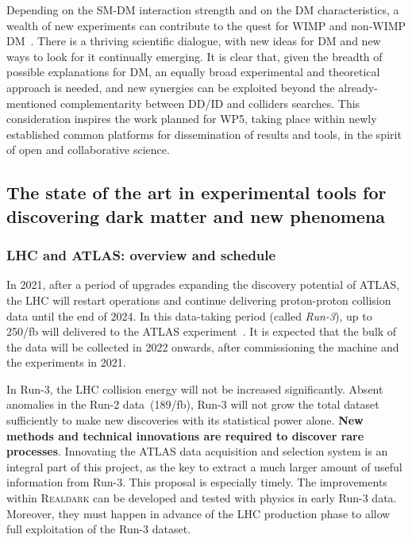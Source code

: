 Depending on the SM-DM interaction strength and on the DM characteristics, a wealth of new experiments can contribute to the quest for WIMP and non-WIMP DM~\cite{Beacham:2019nyx,Bertone:2019irm,Barausse:2020rsu}.
There is a thriving scientific dialogue, with new ideas for DM and new ways to look for it continually emerging.
It is clear that, given the breadth of possible explanations for DM, an equally broad experimental and theoretical approach is needed, 
and new synergies can be exploited beyond the already-mentioned complementarity between DD/ID and colliders searches. 
This consideration inspires the work planned for WP5, taking place within newly established common platforms for dissemination of results and tools, in the spirit of open and collaborative science. 

\subsection{The state of the art in experimental tools for discovering dark matter and new phenomena}
\label{sub:stateOfTheArtExperiment}

\subsubsection{LHC and ATLAS: overview and schedule}
\smallskip

In 2021, after a period of upgrades expanding the discovery potential of ATLAS, the LHC will restart operations and continue delivering proton-proton collision data until the end of 2024. In this data-taking period (called \textit{Run-3}), up to 250/fb will delivered to the ATLAS experiment~\cite{ATLAS2008}.%
It is expected that the bulk of the data will be collected in 2022 onwards, after commissioning the machine and the experiments in 2021. 

In Run-3, the LHC collision energy will not be increased significantly.
Absent anomalies in the Run-2 data~(189/fb), Run-3 will not grow the total dataset sufficiently to make new discoveries with its statistical power alone.
\textbf{New methods and technical innovations are required to discover rare processes}. %
Innovating the ATLAS data acquisition and selection system is an integral part of this project, 
as the key to extract a much larger amount of useful information from Run-3. 
This proposal is especially timely. The improvements within \textsc{Realdark} can be developed and tested with physics in early Run-3 data. 
Moreover, they must happen in advance of the LHC production phase to allow full exploitation of the Run-3 dataset. 

